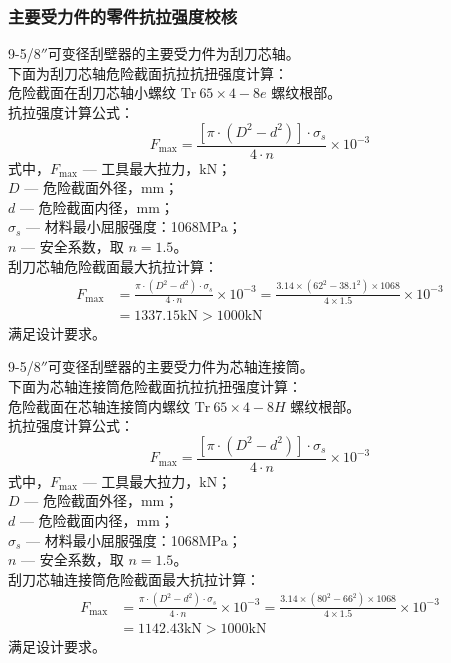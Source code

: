 \subsubsection{主要受力件的零件抗拉强度校核}
9-5/8$''$可变径刮壁器的主要受力件为刮刀芯轴。\\
下面为刮刀芯轴危险截面抗拉抗扭强度计算：\\
危险截面在刮刀芯轴小螺纹 $\mathrm{Tr}\ 65 \times 4 - 8e$ 螺纹根部。\\
抗拉强度计算公式：
\begin{equation*}
    F_{\max} = \frac{[\pi \cdot (D^2 - d^2)] \cdot \sigma_s}{4 \cdot n} \times 10^{-3}
\end{equation*}
式中，$F_{\max}$ --- 工具最大拉力，kN；\\
\indent $D$ --- 危险截面外径，mm；\\
\indent $d$ --- 危险截面内径，mm；\\
\indent $\sigma_s$ --- 材料最小屈服强度：1068MPa；\\
\indent $n$ --- 安全系数，取 $n = 1.5$。\\
刮刀芯轴危险截面最大抗拉计算：
\begin{equation*}
    \begin{split}
        F_{\max} &= \frac{\pi \cdot (D^2 - d^2) \cdot \sigma_s}{4 \cdot n} \times 10^{-3} = \frac{3.14 \times (62^2 - 38.1^2) \times 1068}{4 \times 1.5} \times 10^{-3} \\
        &= 1337.15\text{kN} > 1000\text{kN}
    \end{split}
\end{equation*}
满足设计要求。


9-5/8$''$可变径刮壁器的主要受力件为芯轴连接筒。\\
下面为芯轴连接筒危险截面抗拉抗扭强度计算：\\
危险截面在芯轴连接筒内螺纹 $\mathrm{Tr}\ 65 \times 4 - 8H$ 螺纹根部。\\
抗拉强度计算公式：
\begin{equation*}
    F_{\max} = \frac{[\pi \cdot (D^2 - d^2)] \cdot \sigma_s}{4 \cdot n} \times 10^{-3}
\end{equation*}
式中，$F_{\max}$ --- 工具最大拉力，kN；\\
\indent $D$ --- 危险截面外径，mm；\\
\indent $d$ --- 危险截面内径，mm；\\
\indent $\sigma_s$ --- 材料最小屈服强度：1068MPa；\\
\indent $n$ --- 安全系数，取 $n = 1.5$。\\
刮刀芯轴连接筒危险截面最大抗拉计算：
\begin{equation*}
    \begin{split}
        F_{\max} &= \frac{\pi \cdot (D^2 - d^2) \cdot \sigma_s}{4 \cdot n} \times 10^{-3} = \frac{3.14 \times (80^2 - 66^2) \times 1068}{4 \times 1.5} \times 10^{-3} \\
        &= 1142.43\text{kN} > 1000\text{kN}
    \end{split}
\end{equation*}
满足设计要求。
	
